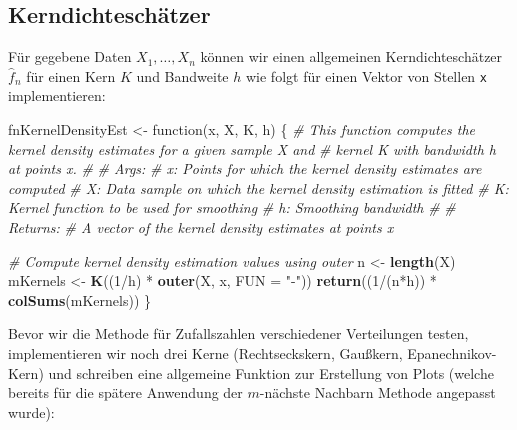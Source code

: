 \documentclass[10pt,]{article}
\newenvironment{Shaded}{\begin{snugshade}}{\end{snugshade}}
\newcommand{\KeywordTok}[1]{\textcolor[rgb]{0.13,0.29,0.53}{\textbf{{#1}}}}
\newcommand{\DataTypeTok}[1]{\textcolor[rgb]{0.13,0.29,0.53}{{#1}}}
\newcommand{\DecValTok}[1]{\textcolor[rgb]{0.00,0.00,0.81}{{#1}}}
\newcommand{\StringTok}[1]{\textcolor[rgb]{0.31,0.60,0.02}{{#1}}}
\newcommand{\CommentTok}[1]{\textcolor[rgb]{0.56,0.35,0.01}{\textit{{#1}}}}
\newcommand{\NormalTok}[1]{{#1}}
\begin{document}
\subsection{Kerndichteschätzer}\label{kerndichteschatzer}

Für gegebene Daten \(X_1, \ldots, X_n\) können wir einen allgemeinen
Kerndichteschätzer \(\hat{f}_n\) für einen Kern \(K\) und Bandweite
\(h\) wie folgt für einen Vektor von Stellen \texttt{x} implementieren:

\begin{Shaded}
\begin{Highlighting}[]
\NormalTok{fnKernelDensityEst <-}\StringTok{ }\NormalTok{function(x, X, K, h) \{}
  \CommentTok{# This function computes the kernel density estimates for a given sample X and}
  \CommentTok{# kernel K with bandwidth h at points x.}
  \CommentTok{# }
  \CommentTok{# Args:}
  \CommentTok{#   x: Points for which the kernel density estimates are computed}
  \CommentTok{#   X: Data sample on which the kernel density estimation is fitted}
  \CommentTok{#   K: Kernel function to be used for smoothing}
  \CommentTok{#   h: Smoothing bandwidth}
  \CommentTok{#   }
  \CommentTok{# Returns:}
  \CommentTok{#   A vector of the kernel density estimates at points x}
  
  \CommentTok{# Compute kernel density estimation values using outer}
  \NormalTok{n <-}\StringTok{ }\KeywordTok{length}\NormalTok{(X)}
  \NormalTok{mKernels <-}\StringTok{ }\KeywordTok{K}\NormalTok{((}\DecValTok{1}\NormalTok{/h) *}\StringTok{ }\KeywordTok{outer}\NormalTok{(X, x, }\DataTypeTok{FUN =} \StringTok{"-"}\NormalTok{))}
  \KeywordTok{return}\NormalTok{((}\DecValTok{1}\NormalTok{/(n*h)) *}\StringTok{ }\KeywordTok{colSums}\NormalTok{(mKernels))}
\NormalTok{\}}
\end{Highlighting}
\end{Shaded}

Bevor wir die Methode für Zufallszahlen verschiedener Verteilungen
testen, implementieren wir noch drei Kerne (Rechtseckskern, Gaußkern,
Epanechnikov-Kern) und schreiben eine allgemeine Funktion zur Erstellung
von Plots (welche bereits für die spätere Anwendung der \(m\)-nächste
Nachbarn Methode angepasst wurde):
\end{document}

